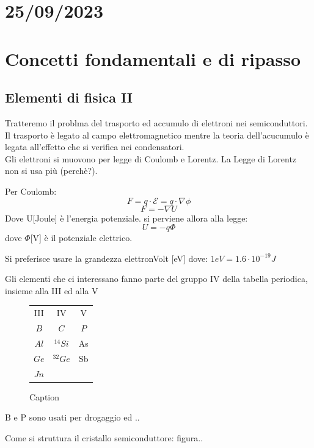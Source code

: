 \section*{25/09/2023}
\section{Concetti fondamentali e di ripasso}
\subsection{Elementi di fisica II}
Tratteremo il problma del trasporto ed accumulo di elettroni nei semiconduttori.\\
Il trasporto è legato al campo elettromagnetico mentre la teoria dell'acucumulo è legata all'effetto che si verifica nei condensatori.\\
Gli elettroni si muovono per legge di Coulomb e Lorentz.
La Legge di Lorentz non si usa più (perchè?).

Per Coulomb:
%
\begin{equation*}
    F = q \cdot \mathcal{E} = q\cdot \nabla\phi 
\end{equation*}
%
\begin{equation*}
    F = -\nabla U
\end{equation*}
%
Dove U[Joule] è l'energia potenziale.
si perviene allora alla legge:
%
\begin{equation*}
    U = -q \Phi
\end{equation*}
%
dove $\Phi$[V] è il potenziale elettrico.

Si preferisce usare la grandezza elettronVolt [eV] dove:
$1 eV = 1.6 \cdot 10^{-19} J$

Gli elementi che ci interessano fanno parte del gruppo IV della tabella periodica, insieme alla III ed alla V
%
\begin{figure}[hbt!]
    \centering
    \begin{tabular}{ccc}
        III  & IV   & V\\
        $B$  & $C$  & $P$\\
        $Al$ & $^{14}Si$ & As \\
        $Ge$ & $^{32}Ge$ & Sb\\
        $Jn$ &  & \\
    \end{tabular}
    \caption{Caption}
    \label{fig:enter-label}
\end{figure}
%
B e P sono usati per drogaggio ed ..

Come si struttura il cristallo semiconduttore:
figura..\\ \\
%
